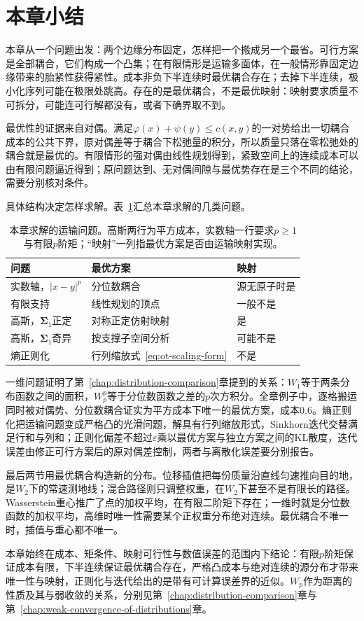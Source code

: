 \section{本章小结}
\label{sec:ot-summary}

本章从一个问题出发：两个边缘分布固定，怎样把一个搬成另一个最省。可行方案是全部耦合，它们构成一个凸集；在有限情形是运输多面体，在一般情形靠固定边缘带来的胎紧性获得紧性。成本非负下半连续时最优耦合存在；去掉下半连续，极小化序列可能在极限处跳高。存在的是最优耦合，不是最优映射：映射要求质量不可拆分，可能连可行解都没有，或者下确界取不到。

最优性的证据来自对偶。满足$\varphi(x)+\psi(y)\leq c(x,y)$的一对势给出一切耦合成本的公共下界，原对偶差等于耦合下松弛量的积分，所以质量只落在零松弛处的耦合就是最优的。有限情形的强对偶由线性规划得到，紧致空间上的连续成本可以由有限问题逼近得到；原问题达到、无对偶间隙与最优势存在是三个不同的结论，需要分别核对条件。

具体结构决定怎样求解。表~\ref{tab:ot-summary}汇总本章求解的几类问题。

\begin{table}[htbp]
 \centering
 \caption{本章求解的运输问题。高斯两行为平方成本，实数轴一行要求$p\geq1$与有限$p$阶矩；“映射”一列指最优方案是否由运输映射实现。}
 \label{tab:ot-summary}
 \begin{tabular}{lll}
  \toprule
  问题 & 最优方案 & 映射\\
  \midrule
  实数轴，$\lvert x-y\rvert^{p}$ & 分位数耦合 & 源无原子时是\\
  有限支持 & 线性规划的顶点 & 一般不是\\
  高斯，$\bm{\Sigma}_1$正定 & 对称正定仿射映射 & 是\\
  高斯，$\bm{\Sigma}_1$奇异 & 按支撑子空间分析 & 可能不是\\
  熵正则化 & 行列缩放式~\eqref{eq:ot-scaling-form} & 不是\\
  \bottomrule
 \end{tabular}
\end{table}

一维问题证明了第~\ref{chap:distribution-comparison}章提到的关系：$W_1$等于两条分布函数之间的面积，$W_p^{p}$等于分位数函数之差的$p$次方积分。全章例子中，逐格搬运同时被对偶势、分位数耦合证实为平方成本下唯一的最优方案，成本$0.6$。熵正则化把运输问题变成严格凸的光滑问题，解具有行列缩放形式，Sinkhorn迭代交替满足行和与列和；正则化偏差不超过$\varepsilon$乘以最优方案与独立方案之间的KL散度，迭代误差由修正可行方案后的原对偶差控制，两者与离散化误差要分别报告。

最后两节用最优耦合构造新的分布。位移插值把每份质量沿直线匀速推向目的地，是$W_2$下的常速测地线；混合路径则只调整权重，在$W_2$下甚至不是有限长的路径。Wasserstein重心推广了点的加权平均，在有限二阶矩下存在；一维时就是分位数函数的加权平均，高维时唯一性需要某个正权重分布绝对连续。最优耦合不唯一时，插值与重心都不唯一。

本章始终在成本、矩条件、映射可行性与数值误差的范围内下结论：有限$p$阶矩保证成本有限，下半连续保证最优耦合存在，严格凸成本与绝对连续的源分布才带来唯一性与映射，正则化与迭代给出的是带有可计算误差界的近似。$W_p$作为距离的性质及其与弱收敛的关系，分别见第~\ref{chap:distribution-comparison}章与第~\ref{chap:weak-convergence-of-distributions}章。
